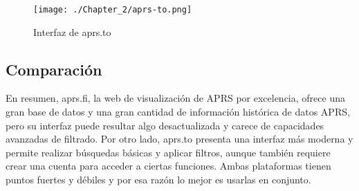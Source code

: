 \begin{figure}[h]
    \centering
    \texttt{[image: ./Chapter\_2/aprs-to.png]}
    \caption{Interfaz de aprs.to}
    \label{fig:aprs-to}
\end{figure}

\subsection{Comparación}

En resumen, aprs.fi, la web de visualización de APRS por excelencia, ofrece una gran base de datos y una gran cantidad de información histórica de datos APRS, pero su interfaz puede resultar algo desactualizada y carece de capacidades avanzadas de filtrado. Por otro lado, aprs.to presenta una interfaz más moderna y permite realizar búsquedas básicas y aplicar filtros, aunque también requiere crear una cuenta para acceder a ciertas funciones. Ambas plataformas tienen puntos fuertes y débiles y por esa razón lo mejor es usarlas en conjunto.
